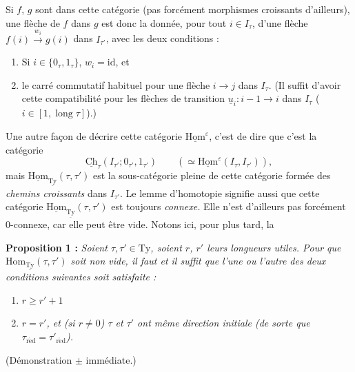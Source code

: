 \documentclass[11pt]{article}
\newcommand{\printedpage}[1]{\marginpar{\footnotesize p.~#1}}
\newcommand{\msp}[1]{\marginpar{\vspace*{10pt}\footnotesize [#1]}}
\newcommand{\uTy}{\underline{\mathrm{Ty}}}
\newcommand{\red}{\mathrm{r\acute{e}d}}
\newcommand{\uHom}{\underline{\mathrm{Hom}}}
\newcommand{\ul}[1]{\underline{#1}}
\begin{document}
Si $f$, $g$ sont dans cette catégorie (pas forcément morphismes croissants d'ailleurs), une flèche de $f$ dans $g$ est donc la donnée, pour tout $i\in I_\tau$, d'une flèche $f(i)\xrightarrow{w_i}g(i)$ dans $I_{\tau'}$, avec les deux conditions :

\begin{enumerate}[label={}, leftmargin=*]
\item[a)] Si $i\in\{0_\tau,1_\tau\}$, $w_i=\mathrm{id}$, et
\item[b)] le carré commutatif habituel pour une flèche $i\longrightarrow j$ dans $I_\tau$. (Il suffit d'avoir cette compatibilité pour les flèches de transition $\ul{u}_i:i-1\longrightarrow i$ dans $I_\tau$ ($i\in[1,\operatorname{long}\tau]$).)
\end{enumerate}

Une autre façon de décrire cette catégorie $\uHom^\varepsilon$, c'est de dire que c'est la catégorie
\msp{page 84}
\[
\underline{\mathrm{Ch}}_\tau(I_{\tau'};0_{\tau'},1_{\tau'})\qquad(\simeq\uHom^\varepsilon(I_\tau,I_{\tau'})),
\]
mais $\uHom_{\uTy}(\tau,\tau')$ est la sous-catégorie pleine de cette catégorie formée des \textit{chemins croissants} dans $I_{\tau'}$. Le lemme d'homotopie signifie aussi que cette catégorie $\uHom_{\uTy}(\tau,\tau')$ est toujours \textit{connexe.} Elle n'est d'ailleurs pas forcément 0-connexe, car elle peut être vide. Notons ici, pour plus tard, la

\textbf{Proposition 1 :} \textit{Soient $\tau,\tau'\in\mathrm{Ty}$, soient $r$, $r'$ leurs longueurs utiles. Pour que $\mathrm{Hom}_{\uTy}(\tau,\tau')$ soit non vide, il faut et il suffit que l'une ou l'autre des deux conditions suivantes soit satisfaite :}

\begin{enumerate}[label={}, leftmargin=*]
\item[\textit{a)}] $r\geq r'+1$

\printedpage{55}

\item[\textit{b)}] \textit{$r=r'$, et (si $r\neq0$) $\tau$ et $\tau'$ ont même direction initiale (de sorte que $\tau_{\red}=\tau'_{\red}$).}
\end{enumerate}

(Démonstration $\pm$ immédiate.)
\end{document}
